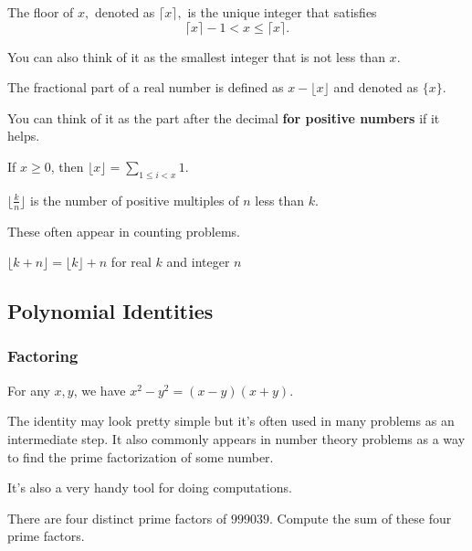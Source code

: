 \documentclass[mast]{lucky}
\begin{document}
\begin{defi}[Ceiling]
The floor of $x,$ denoted as $\lceil x\rceil,$ is the unique integer that satisfies
\[\lceil x\rceil-1< x\leq \lceil x\rceil.\]
\end{defi}
You can also think of it as the smallest integer that is not less than $x.$

\begin{defi}
The fractional part of a real number is defined as $x - \lfloor x \rfloor$ and denoted as $\{x\}.$
\end{defi}

You can think of it as the part after the decimal \textbf{for positive numbers} if it helps.

\begin{theo}
If $x\ge 0$, then $\lfloor x \rfloor = \sum_{1\leq i < x} 1$.
\end{theo}

\begin{theo}
$\lfloor \frac{k}{n} \rfloor$ is the number of positive multiples of $n$ less than $k$.
\end{theo}
These often appear in counting problems.

\begin{theo}
$\lfloor k+n\rfloor = \lfloor k \rfloor + n$ for real $k$ and integer $n$
\end{theo}
\subsection{Polynomial Identities}
\subsubsection{Factoring}
\begin{theo}
For any $x,y$, we have $x^2-y^2=(x-y)(x+y)$.
\end{theo}
The identity may look pretty simple but it's often used in many problems as an intermediate step. It also commonly appears in number theory problems as a way to find the prime factorization of some number.

It's also a very handy tool for doing computations.

\begin{exam}
There are four distinct prime factors of $999039$. Compute the sum of these four prime factors.
\end{exam}
\end{document}
